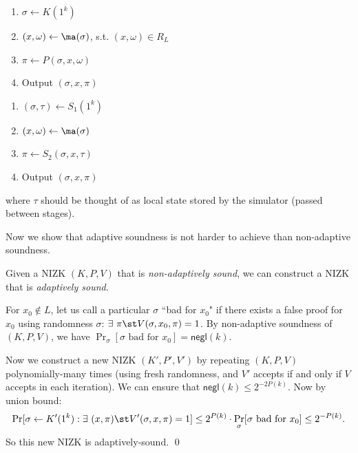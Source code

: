 \medskip
\begin{minipage}{0.5\textwidth}
    \begin{enumerate}[itemsep=0pt]
        \item $\sigma \gets K(1^k)$
        \item $(x, \omega) \gets \ma(\sigma)$, s.t. $(x, \omega) \in R_L$
        \item $\pi \gets P(\sigma, x, \omega)$
        \item Output $(\sigma, x, \pi)$
    \end{enumerate}
\end{minipage}
\begin{minipage}{0.5\textwidth}
    \begin{enumerate}[itemsep=0pt]
        \item $(\sigma, \tau) \gets S_1(1^k)$
        \item $(x, \omega) \gets \ma(\sigma)$
        \item $\pi \gets S_2(\sigma, x, \tau)$
        \item Output $(\sigma, x, \pi)$
    \end{enumerate}
\end{minipage}

\medskip
\noindent where $\tau$ should be thought of as local state stored by the simulator (passed
    between stages).

\bigskip
Now we show that adaptive soundness is not harder to achieve than non-adaptive soundness.
\begin{theorem}\label{thm:amplify-soundness}
    Given a NIZK $(K, P, V)$ that is \emph{non-adaptively sound}, we can
    construct a NIZK \DIFaddbegin {}\DIFaddend that is \emph{adaptively sound}.
\end{theorem}
\proof
For $x_0 \not\in L$, let us call a particular $\sigma$ ``bad for $x_0$" if 
there exists a false proof for $x_0$ using randomness $\sigma$:
$\exists~ \pi \st V(\sigma, x_0, \pi) = 1$.
By non-adaptive soundness of $(K, P, V)$, we have
$\Pr_\sigma[\sigma \text{ bad for } x_0] = \mathsf{negl}(k)$.

Now we construct a new NIZK $(K',P',V')$ by repeating $(K,P,V)$ polynomially-many times
(using fresh randomness, and $V'$ accepts if and only if $V$ accepts in each iteration).
We can ensure that $\mathsf{negl}(k) \leq 2^{-2P(k)}$.
Now by union bound:
$$
\Pr[\sigma \gets K'(1^k): \exists~ (x, \pi) \st V'(\sigma, x, \pi) = 1] \leq
2^{P(k)}\cdot \Pr_\sigma[\sigma \text{ bad for } x_0] \leq 2^{-P(k)}.$$
So this new NIZK is adaptively-sound. \qed

